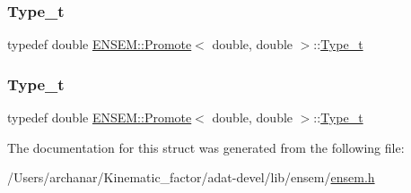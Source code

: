\mbox{\label{structENSEM_1_1Promote_3_01double_00_01double_01_4_a24ebc4a5bef63c7bb489c2cf17b184ab}} 
\subsubsection{\texorpdfstring{Type\_t}{Type\_t}\hspace{0.1cm}{\footnotesize\ttfamily [2/3]}}
{\footnotesize\ttfamily typedef double \mbox{\hyperlink{structENSEM_1_1Promote}{E\+N\+S\+E\+M\+::\+Promote}}$<$ double, double $>$\+::\mbox{\hyperlink{structENSEM_1_1Promote_3_01double_00_01double_01_4_a24ebc4a5bef63c7bb489c2cf17b184ab}{Type\+\_\+t}}}

\mbox{\label{structENSEM_1_1Promote_3_01double_00_01double_01_4_a24ebc4a5bef63c7bb489c2cf17b184ab}} 
\subsubsection{\texorpdfstring{Type\_t}{Type\_t}\hspace{0.1cm}{\footnotesize\ttfamily [3/3]}}
{\footnotesize\ttfamily typedef double \mbox{\hyperlink{structENSEM_1_1Promote}{E\+N\+S\+E\+M\+::\+Promote}}$<$ double, double $>$\+::\mbox{\hyperlink{structENSEM_1_1Promote_3_01double_00_01double_01_4_a24ebc4a5bef63c7bb489c2cf17b184ab}{Type\+\_\+t}}}



The documentation for this struct was generated from the following file\+:\begin{DoxyCompactItemize}
\item 
/\+Users/archanar/\+Kinematic\+\_\+factor/adat-\/devel/lib/ensem/\mbox{\hyperlink{adat-devel_2lib_2ensem_2ensem_8h}{ensem.\+h}}\end{DoxyCompactItemize}
